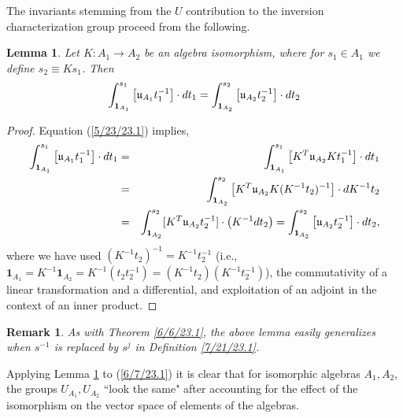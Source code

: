 \documentclass{amsart}
\numberwithin{equation}{section}
\newtheorem{remark}[theorem]{Remark}
\newtheorem{lemma}[theorem]{Lemma}
\theoremstyle{definition}
\numberwithin{theorem}{section}
\begin{document}
The invariants stemming from the $U$ contribution to the inversion characterization group proceed from the following. 


\begin{lemma}\label{6/6/23.2} Let $K:A_1\rightarrow A_2$ be an algebra isomorphism, where for $s_1\in A_1$ we define $s_2\equiv Ks_1$.  Then \[ \int_{{\bf 1}_{A_1}}^{s_1} \left[\mathfrak{u}_{A_1}t_1^{-1}\right]\cdot dt_1 
= \int_{{\bf 1}_{A_2}}^{s_2} \left[\mathfrak{u}_{A_2}t_2^{-1}\right]\cdot dt_2  \] \end{lemma}

\begin{proof} 
Equation (\ref{5/23/23.1}) implies,
\begin{eqnarray*} \int_{{\bf 1}_{A_1}}^{s_1} \left[\mathfrak{u}_{A_1}t_1^{-1}\right]\cdot dt_1 &=& \int_{{\bf 1}_{A_1}}^{s_1} \left[ K^T\mathfrak{u}_{A_2}Kt_1^{-1}\right]\cdot dt_1 \\ &=& 
\int_{{\bf 1}_{A_2}}^{s_2} \left[ K^T\mathfrak{u}_{A_2}K (K^{-1}t_2)^{-1}\right]\cdot dK^{-1}t_2 \\ &=& \int_{{\bf 1}_{A_2}}^{s_2} [K^T\mathfrak{u}_{A_2}t_2^{-1}]\cdot \left(K^{-1}dt_2\right) = \int_{{\bf 1}_{A_2}}^{s_2} \left[\mathfrak{u}_{A_2}t_2^{-1}\right]\cdot dt_2, 
\end{eqnarray*}
where we have used $(K^{-1}t_2)^{-1} = K^{-1}t_2^{-1}$ (i.e., $\mathbf{1}_{A_1} = K^{-1}\mathbf{1}_{A_2} = K^{-1}(t_2t_2^{-1}) = (K^{-1}t_2)(K^{-1}t_2^{-1})$), the commutativity of a linear transformation and a differential, and exploitation of an adjoint in the context of an inner product.
\end{proof}

\begin{remark} {\rm As with Theorem \ref{6/6/23.1}, the above lemma easily generalizes when $s^{-1}$ is replaced by $s^{j}$ in Definition \ref{7/21/23.1}.}\end{remark}

Applying Lemma \ref{6/6/23.2} to (\ref{6/7/23.1}) it is clear that for isomorphic algebras $A_1,A_2$, the groups $ U_{A_1},  U_{A_2}$ ``look the same" after accounting for the effect of the isomorphism on the vector space of elements of the algebras.
\end{document}
